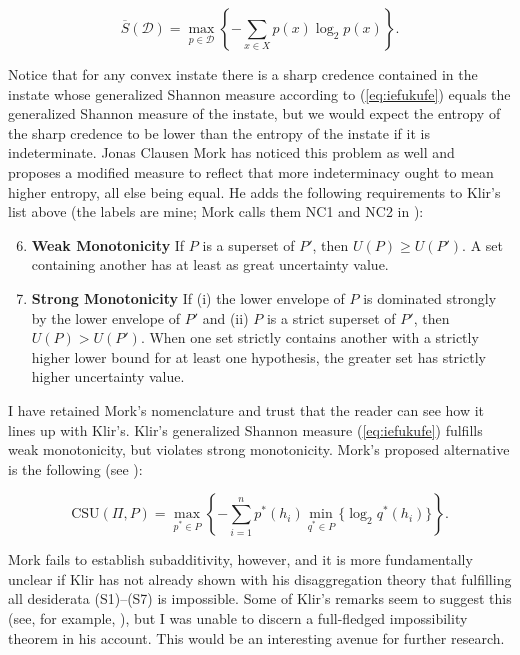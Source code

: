 \documentclass[11pt]{article}
\begin{document}
\begin{equation}
  \label{eq:iefukufe}
\overline{S}(\mathcal{D})=\max_{p\in\mathcal{D}}\left\{-\sum_{x\in{}X}p(x)\log_{2}p(x)\right\}.
\end{equation}

Notice that for any convex instate there is a sharp credence contained
in the instate whose generalized Shannon measure according to
(\ref{eq:iefukufe}) equals the generalized Shannon measure of the
instate, but we would expect the entropy of the sharp credence to be
lower than the entropy of the instate if it is indeterminate. Jonas
Clausen Mork has noticed this problem as well and proposes a modified
measure to reflect that more indeterminacy ought to mean higher
entropy, all else being equal. He adds the following requirements to
Klir's list above (the labels are mine; Mork calls them NC1 and NC2 in
):

\begin{enumerate}[(S1)]
\setcounter{enumi}{5}
\item \textbf{Weak Monotonicity} If $P$ is a superset of $P'$, then
  $U(P)\geq{}U(P')$. A set containing another has at least as great
  uncertainty value.
\item \textbf{Strong Monotonicity} If (i) the lower envelope of $P$ is
  dominated strongly by the lower envelope of $P'$ and (ii) $P$ is a
  strict superset of $P'$, then $U(P)>U(P')$. When one set strictly
  contains another with a strictly higher lower bound for at least one
  hypothesis, the greater set has strictly higher uncertainty value.
\end{enumerate}

I have retained Mork's nomenclature and trust that the reader can see
how it lines up with Klir's. Klir's generalized Shannon measure
(\ref{eq:iefukufe}) fulfills weak monotonicity, but violates strong
monotonicity. Mork's proposed alternative is
the following (see ):

\begin{equation}
  \label{eq:aeghapoo}
  \mbox{CSU}(\Pi,P)=\max_{p^{*}\in{}P}\left\{-\sum_{i=1}^{n}p^{*}(h_{i})\min_{q^{*}\in{}P}\{\log_{2}q^{*}(h_{i})\}\right\}.
\end{equation}

Mork fails to establish subadditivity, however, and it is more
fundamentally unclear if Klir has not already shown with his
disaggregation theory that fulfilling all desiderata (S1)--(S7) is
impossible. Some of Klir's remarks seem to suggest this (see, for
example, ), but I was unable to discern a
full-fledged impossibility theorem in his account. This would be an
interesting avenue for further research.
\end{document}
